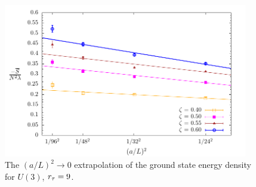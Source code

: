 \begin{figure}[htb]
\begin{center} 
\includegraphics[width=0.95\textwidth]{Figures/cont_U3_rt9.pdf}
\end{center}
\caption{\label{fig:cont_U3}The $(a/L)^2 \to 0$ extrapolation of the ground state energy density for $U(3)$, ${r_{\tau}}=9$.}
\end{figure}


